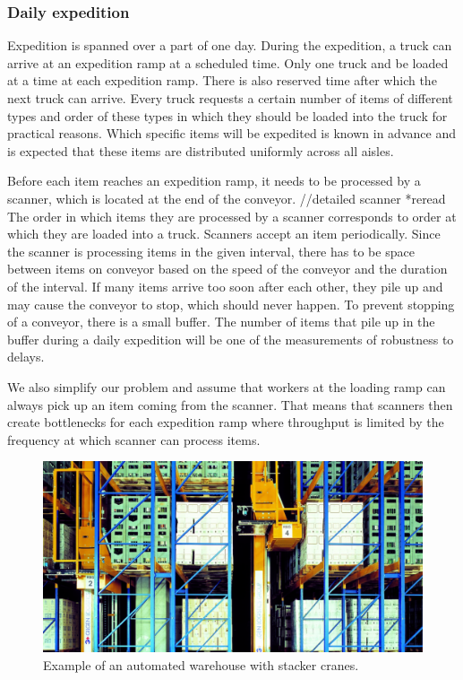 \documentclass{ctuthesis}
\begin{document}
\subsubsection{Daily expedition}
Expedition is spanned over a part of one day. During the expedition, a truck can arrive at an expedition ramp at a scheduled time. Only one truck and be loaded at a time at each expedition ramp. There is also reserved time after which the next truck can arrive. Every truck requests a certain number of items of different types and order of these types in which they should be loaded into the truck for practical reasons. Which specific items will be expedited is known in advance and is expected that these items are distributed uniformly across all aisles. 

Before each item reaches an expedition ramp, it needs to be processed by a scanner, which is located at the end of the conveyor. 
//detailed scanner *reread
The order in which items they are processed by a scanner corresponds to order at which they are loaded into a truck. Scanners accept an item periodically. Since the scanner is processing items in the given interval, there has to be space between items on conveyor based on the speed of the conveyor and the duration of the interval. If many items arrive too soon after each other, they pile up and may cause the conveyor to stop, which should never happen. To prevent stopping of a conveyor, there is a small buffer. The number of items that pile up in the buffer during a daily expedition will be one of the measurements of robustness to delays.

We also simplify our problem and assume that workers at the loading ramp can always pick up an item coming from the scanner. That means that scanners then create bottlenecks for each expedition ramp where throughput is limited by the frequency at which scanner can process items.



\begin{figure}
\includegraphics[width=0.8\linewidth]{highbaywarehouse.jpg}
\caption{Example of an automated warehouse with stacker cranes. \cite{warehousepic}}
\label{fig:foobar}
\end{figure}
\end{document}
